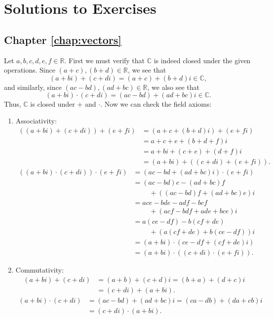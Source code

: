 \chapter{Solutions to Exercises}

\section*{Chapter \ref{chap:vectors}}

\begin{sltn}[\ref{exer:cfield}]
Let $ a,b,c,d,e,f\in\mathbb{R} $. First we must verify that $ \mathbb{C} $ is indeed closed under the given operations. Since $ (a+c),(b+d)\in\mathbb{R} $, we see that
\begin{equation*}
    (a+bi)+(c+di)=(a+c)+(b+d)i\in\mathbb{C},
\end{equation*}
and similarly, since $ (ac-bd),(ad+bc)\in\mathbb{R} $, we also see that
\begin{equation*}
    (a+bi)\cdot(c+di)=(ac-bd)+(ad+bc)i\in\mathbb{C}.
\end{equation*}
Thus, $ \mathbb{C} $ is closed under $ + $ and $ \cdot $. Now we can check the field axioms:
\begin{enumerate}
    \item Associativity:
    \begin{align*}
        ((a+bi)+(c+di))+(e+fi) &= (a+c+(b+d)i)+(e+fi) \\
        &= a+c+e+(b+d+f)i \\
        &= a+bi+(c+e)+(d+f)i \\
        &= (a+bi)+((c+di)+(e+fi)).
    \end{align*}
    \begin{align*}
        ((a+bi)\cdot(c+di))\cdot(e+fi) &= (ac-bd+(ad+bc)i)\cdot(e+fi) \\
        &= (ac-bd)e-(ad+bc)f \\
        &\phantom{=}\quad +((ac-bd)f+(ad+bc)e)i \\
        &= ace-bde-adf-bcf \\
        &\phantom{=}\quad +(acf-bdf+ade+bce)i \\
        &= a(ce-df)-b(cf+de) \\
        &\phantom{=}\quad +(a(cf+de)+b(ce-df))i \\
        &= (a+bi)\cdot(ce-df+(cf+de)i) \\
        &= (a+bi)\cdot((c+di)\cdot(e+fi)).
    \end{align*}

    \item Commutativity:
    \begin{align*}
        (a+bi)+(c+di) &= (a+b)+(c+d)i=(b+a)+(d+c)i \\
        &= (c+di)+(a+bi).
    \end{align*}
    \begin{align*}
        (a+bi)\cdot(c+di) &= (ac-bd)+(ad+bc)i=(ca-db)+(da+cb)i \\
        &= (c+di)\cdot(a+bi).
    \end{align*}


\end{enumerate}
\end{sltn}
